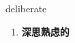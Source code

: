 
\begin{frame}
{\huge deliberate}
\begin{center}
\begin{enumerate}\Large
  \item \textbf{深思熟虑的}
\end{enumerate}
\end{center}
\end{frame}
